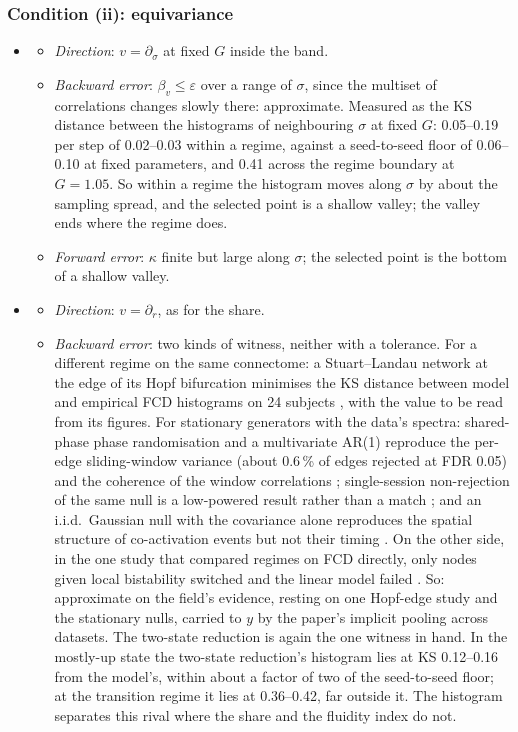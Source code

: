 \documentclass[11pt]{article}
\begin{document}
\subsubsection{Condition (ii): equivariance}
\begin{itemize}
\item[$\Theta_1$]
  \begin{itemize}
  \item \emph{Direction}: $v=\partial_\sigma$ at fixed $G$ inside the band.
  \item \emph{Backward error}: $\beta_v\le\varepsilon$ over a range of $\sigma$, since the multiset of correlations changes slowly there: approximate. Measured as the KS distance between the histograms of neighbouring $\sigma$ at fixed $G$: 0.05--0.19 per step of 0.02--0.03 within a regime, against a seed-to-seed floor of 0.06--0.10 at fixed parameters, and 0.41 across the regime boundary at $G=1.05$. So within a regime the histogram moves along $\sigma$ by about the sampling spread, and the selected point is a shallow valley; the valley ends where the regime does.
  \item \emph{Forward error}: $\kappa$ finite but large along $\sigma$; the selected point is the bottom of a shallow valley.
  \end{itemize}
\item[$\Theta_2$]
  \begin{itemize}
  \item \emph{Direction}: $v=\partial_r$, as for the share.
  \item \emph{Backward error}: two kinds of witness, neither with a tolerance. For a different regime on the same connectome: a Stuart--Landau network at the edge of its Hopf bifurcation minimises the KS distance between model and empirical FCD histograms on 24 subjects \parencite{deco2017}, with the value to be read from its figures. For stationary generators with the data's spectra: shared-phase phase randomisation and a multivariate AR(1) reproduce the per-edge sliding-window variance (about 0.6\,\% of edges rejected at FDR 0.05) and the coherence of the window correlations \parencite{liegeois2017}; single-session non-rejection of the same null is a low-powered result rather than a match \parencite{hindriks2016}; and an i.i.d.\ Gaussian null with the covariance alone reproduces the spatial structure of co-activation events but not their timing \parencite{novelli2022}. On the other side, in the one study that compared regimes on FCD directly, only nodes given local bistability switched and the linear model failed \parencite{hansen2015}. So: approximate on the field's evidence, resting on one Hopf-edge study and the stationary nulls, carried to $y$ by the paper's implicit pooling across datasets. The two-state reduction is again the one witness in hand. In the mostly-up state the two-state reduction's histogram lies at KS 0.12--0.16 from the model's, within about a factor of two of the seed-to-seed floor; at the transition regime it lies at 0.36--0.42, far outside it. The histogram separates this rival where the share and the fluidity index do not.

\end{itemize}
\end{itemize}
\end{document}
